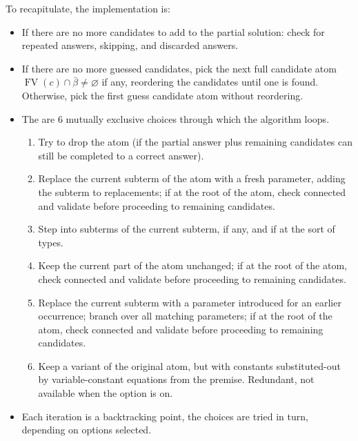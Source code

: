 \documentclass{article}
\newcommand{\tmop}[1]{\ensuremath{\operatorname{#1}}}
\newcommand{\tmverbatim}[1]{{\ttfamily{#1}}}
\begin{document}
To recapitulate, the implementation is:
\begin{itemize}
  \item If there are no more candidates to add to the partial solution: check
  for repeated answers, skipping, and discarded answers.
  
  \item If there are no more guessed candidates, pick the next full candidate
  atom $\tmop{FV} (c) \cap \bar{\beta} \neq \varnothing$ if any, reordering
  the candidates until one is found. Otherwise, pick the first guess candidate
  atom without reordering.
  
  \item The are 6 mutually exclusive choices through which the algorithm
  loops.
  \begin{enumerate}
    \item Try to drop the atom (if the partial answer plus remaining
    candidates can still be completed to a correct answer).
    
    \item Replace the current subterm of the atom with a fresh parameter,
    adding the subterm to replacements; if at the root of the atom, check
    connected and validate before proceeding to remaining candidates.
    
    \item Step into subterms of the current subterm, if any, and if at the
    sort of types.
    
    \item Keep the current part of the atom unchanged; if at the root of the
    atom, check connected and validate before proceeding to remaining
    candidates.
    
    \item Replace the current subterm with a parameter introduced for an
    earlier occurrence; branch over all matching parameters; if at the root of
    the atom, check connected and validate before proceeding to remaining
    candidates.
    
    \item Keep a variant of the original atom, but with constants
    substituted-out by variable-constant equations from the premise.
    Redundant, not available when the option \tmverbatim{-more\_general} is
    on.
  \end{enumerate}
  \item Each iteration is a backtracking point, the choices are tried in turn,
  depending on options selected.
  

\end{itemize}
\end{document}
